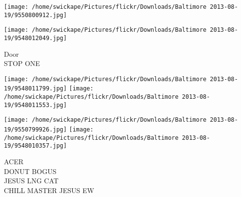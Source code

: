 \documentclass[10pt,letterpaper]{article}
\begin{document}
\texttt{[image: /home/swickape/Pictures/flickr/Downloads/Baltimore 2013-08-19/9550800912.jpg]}

\vspace{0.25in}
\texttt{[image: /home/swickape/Pictures/flickr/Downloads/Baltimore 2013-08-19/9548012049.jpg]}

Door\\
STOP ONE
\pagebreak

\texttt{[image: /home/swickape/Pictures/flickr/Downloads/Baltimore 2013-08-19/9548011799.jpg]}
\texttt{[image: /home/swickape/Pictures/flickr/Downloads/Baltimore 2013-08-19/9548011553.jpg]}

\texttt{[image: /home/swickape/Pictures/flickr/Downloads/Baltimore 2013-08-19/9550799926.jpg]}
\texttt{[image: /home/swickape/Pictures/flickr/Downloads/Baltimore 2013-08-19/9548010357.jpg]}

ACER\\
DONUT BOGUS\\
JESUS LNG CAT\\
CHILL MASTER JESUS EW
\pagebreak
\end{document}
